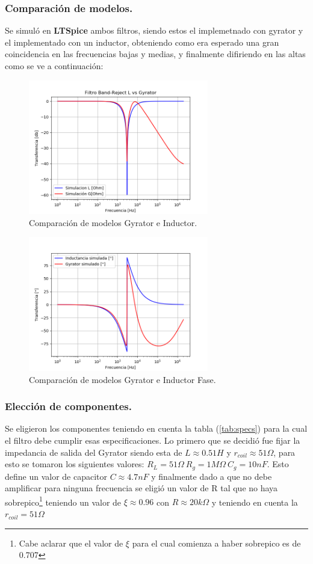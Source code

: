 \documentclass[a4paper]{article}
\begin{document}
\subsubsection{Comparación de modelos.}
Se simuló en \textbf{LTSpice} ambos filtros, siendo estos el implemetnado con gyrator y el implementado con un inductor, obteniendo como era esperado una gran coincidencia en las frecuencias bajas y medias, y finalmente difiriendo en las altas como se ve a continuación:
\begin{figure}[H]	
	\centering
	\includegraphics[width=0.7\textwidth]{ImagenesEj2/simBR.PNG}
	\caption{Comparación de modelos Gyrator e Inductor.}
	\label{fig:gyrIndBR}
\end{figure}
\begin{figure}[H]	
	\centering
	\includegraphics[width=0.7\textwidth]{ImagenesEj2/simBRP.PNG}
	\caption{Comparación de modelos Gyrator e Inductor Fase.}
	\label{fig:gyrIndPBR}
\end{figure}
\subsubsection{Elección de componentes.}
Se eligieron los componentes teniendo en cuenta la tabla (\ref{tab:specs}) para la cual el filtro debe cumplir esas especificaciones.
Lo primero que se decidió fue fijar la impedancia de salida del Gyrator siendo esta de $L \approx 0.51H $ y $r_{coil} \approx 51\Omega $, para esto se tomaron los siguientes valores: $R_L = 51\Omega \ R_g = 1M\Omega \ C_g = 10nF$.
 Esto define un valor de capacitor $C \approx 4.7nF$ y finalmente dado a que no debe amplificar para ninguna frecuencia se eligió un valor de R tal que no haya sobrepico\footnote{Cabe aclarar que el valor de $\xi$ para el cual comienza a haber sobrepico es de 0.707} teniendo un valor de $\xi \approx 0.96 $ con $R \approx 20k\Omega $ y teniendo en cuenta la $r_{coil} = 51\Omega$  
\end{document}
